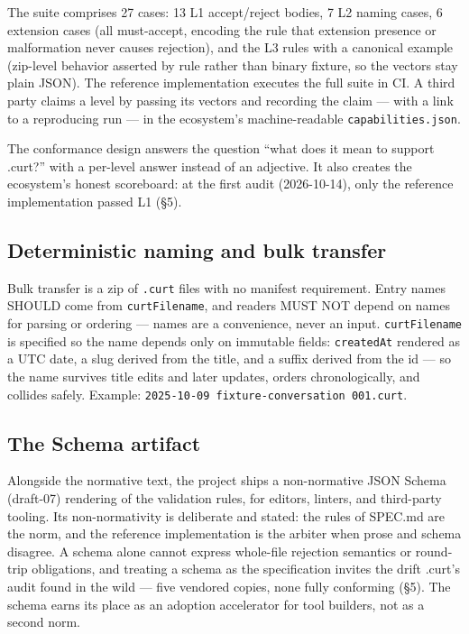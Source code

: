 \documentclass[11pt]{article}
\begin{document}
The suite comprises 27 cases: 13 L1 accept/reject bodies, 7 L2 naming cases, 6 extension cases (all must-accept, encoding the rule that extension presence or malformation never causes rejection), and the L3 rules with a canonical example (zip-level behavior asserted by rule rather than binary fixture, so the vectors stay plain JSON). The reference implementation executes the full suite in CI. A third party claims a level by passing its vectors and recording the claim --- with a link to a reproducing run --- in the ecosystem's machine-readable \texttt{capabilities.json}.

The conformance design answers the question ``what does it mean to support .curt?'' with a per-level answer instead of an adjective. It also creates the ecosystem's honest scoreboard: at the first audit (2026-10-14), only the reference implementation passed L1 (\S5).

\subsection{Deterministic naming and bulk transfer}

Bulk transfer is a zip of \texttt{.curt} files with no manifest requirement. Entry names SHOULD come from \texttt{curtFilename}, and readers MUST NOT depend on names for parsing or ordering --- names are a convenience, never an input. \texttt{curtFilename} is specified so the name depends only on immutable fields: \texttt{createdAt} rendered as a UTC date, a slug derived from the title, and a suffix derived from the id --- so the name survives title edits and later updates, orders chronologically, and collides safely. Example: \texttt{2025-10-09 fixture-conversation 001.curt}.

\subsection{The Schema artifact}

Alongside the normative text, the project ships a non-normative JSON Schema (draft-07) rendering of the validation rules, for editors, linters, and third-party tooling. Its non-normativity is deliberate and stated: the rules of SPEC.md are the norm, and the reference implementation is the arbiter when prose and schema disagree. A schema alone cannot express whole-file rejection semantics or round-trip obligations, and treating a schema as the specification invites the drift .curt's audit found in the wild --- five vendored copies, none fully conforming (\S5). The schema earns its place as an adoption accelerator for tool builders, not as a second norm.
\end{document}
